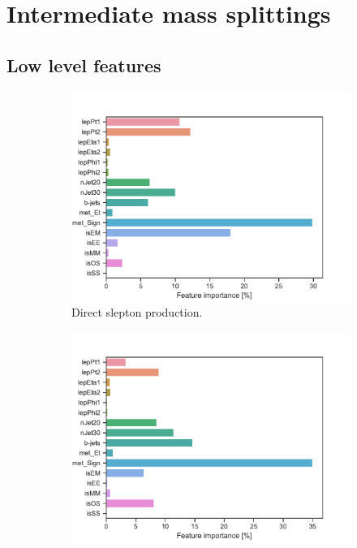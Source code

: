 \section{Intermediate mass splittings}
\subsection{Low level features}
\begin{figure}[H]
    \centering
    \begin{subfigure}[t!]{0.49\textwidth}
        \includegraphics[width = \textwidth]{Figures/SlepSlep/ML/BDT/Low_level/Inter/featureImportance.pdf}
        \caption{Direct slepton production.}
        \label{fig:featSlepslepLow}
    \end{subfigure}
    \begin{subfigure}[t!]{0.49\textwidth}
        \includegraphics[width = \textwidth]{Figures/SlepSnu/BDT/Low_level/Inter/featureImportance.pdf}

\end{subfigure}
\end{figure}
